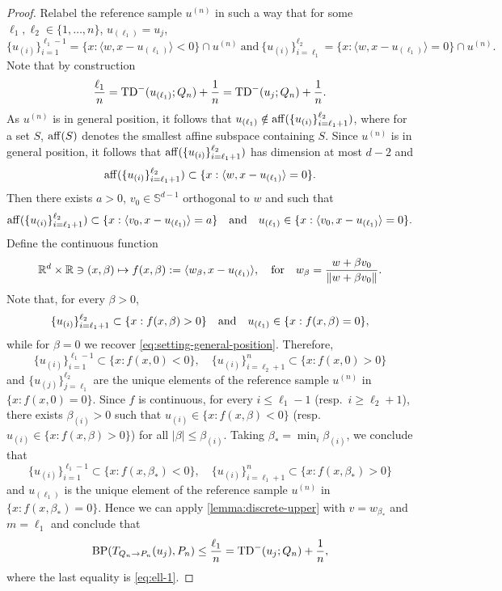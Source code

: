 \documentclass[11pt]{article}
\newcommand{\RR}{\mathbb{R}}
\newcommand{\R}{\RR}
\theoremstyle{plain}
\theoremstyle{definition}\newtheorem{definition}[theorem]{Definition}
\theoremstyle{remark}
\begin{document}
\begin{proof}
 Relabel the reference sample $u^{(n)}$ in such a way that for some ${\ell}_1,\ell_2\in \{1, \dots, n\}$,  $u_{(\ell_1)}= u_j$,
\begin{equation}
    \label{eq:setting-general-position}
     \{u_{(i)}\}_{i=1}^{\ell_1-1}= \{ x: \langle w, x-u_{(\ell_1)}\rangle < 0\} \cap u^{(n)} \ \text{and}\   \{u_{(i)}\}_{i=\ell_1}^{\ell_2}= \{ x: \langle w, x-u_{(\ell_1)}\rangle =  0\} \cap u^{(n)}.
\end{equation}
%
Note that by construction
%
\begin{equation}
    \label{eq:ell-1}
   \frac{ \ell_1}{n}=  {\rm TD}^{-}(u_{(\ell_1)};Q_n)+\frac{1}{n}=  {\rm TD}^{-}(u_j;Q_n)+\frac{1}{n}.
\end{equation}
%
 As $u^{(n)}$ is in general position, it follows that $ u_{(\ell_1)}\notin {\rm aff}( \{u_{(i)}\}_{i=\ell_1+1}^{\ell_2})$, where for a set $S$,   ${\rm aff}(S)$  denotes the smallest affine subspace containing $S$. Since  $u^{(n)}$ is in general position,  it follows that ${\rm aff}( \{u_{(i)}\}_{i=\ell_1+1}^{\ell_2})$ has  dimension  at most $d-2$ and  
 $$ {\rm aff}( \{u_{(i)}\}_{i=\ell_1+1}^{\ell_2})\subset  \{ x: \langle w, x-u_{(\ell_1)}\rangle =  0\}. $$ 
 Then there exists $a>0$,  $v_0 \in \mathbb{S}^{d-1} $ orthogonal to $ w$ and such that 
$$ {\rm aff}(\{u_{(i)}\}_{i=\ell_1+1}^{\ell_2})\subset \{  x: \langle  v_0,x-u_{(\ell_1)}  \rangle =a \} \quad {\rm and}\quad u_{(\ell_1)} \in \{  x: \langle v_0, x -u_{(\ell_1)} \rangle =0 \} . $$
%
Define the continuous function 
%
$$ \R^d\times \R \ni (x,\beta)\mapsto f(x,\beta):= \langle    w_\beta, x -u_{(\ell_1)} \rangle, \quad {\rm for }\quad  w_\beta =\frac{w+ \beta v_0}{\|w+ \beta v_0\|}.   $$
%
Note that, for every $\beta>0$, 
%
$$ \{u_{(i)}\}_{i=\ell_1+1}^{\ell_2} \subset  \{  x: f(x,\beta) >0  \} \quad {\rm and}\quad  u_{(\ell_1)} \in \{  x: f(x,\beta) =0  \}, $$
%
while for $\beta=0$ we recover \eqref{eq:setting-general-position}. Therefore,
%
$$ \{u_{(i)}\}_{i=1}^{\ell_1-1} \subset  \{  x: f(x,0) <0  \},  \quad \{u_{(i)}\}_{i=\ell_2+1}^{n} \subset  \{  x: f(x,0)>0  \} $$ 
%
and $ \{u_{(j)}\}_{j=\ell_1}^{\ell_2}$ are the unique elements of the reference sample $u^{(n)}$ in $\{  x: f(x,0) =0  \}$. Since $f$ is continuous, for every $i\leq \ell_1-1$ (resp.~$i\geq \ell_2+1$), there exists $\beta_{(i)}>0$ such that   $u_{(i)} \in \{  x: f(x,\beta) <0  \} $ (resp.~$u_{(i)} \in \{  x: f(x,\beta) >0  \} $) for all $|\beta|\leq \beta_{(i)}$. Taking $\beta_*=\min_{i} \beta_{(i)}$, we conclude that 
%
$$ \{u_{(i)}\}_{i=1}^{\ell_1-1} \subset  \{  x: f(x,\beta_*) <0  \},  \quad  \{u_{(i)}\}_{i=\ell_1+1}^{n} \subset  \{  x: f(x,\beta_*) >0  \}  $$
%
 and $ u_{(\ell_1)}$ is the unique element of the reference sample $u^{(n)}$ in $\{  x: f(x,\beta_*) =0  \}$. Hence we can apply \cref{lemma:discrete-upper} with $v=w_{\beta_*}$ and $m= \ell_1$ and conclude that 
$$  {\rm BP}({ T}_{Q_n\to P_n}(u_j), P_n) \leq  
\frac{\ell_1}{n}={\rm TD}^{-}(u_j;Q_n)+\frac{1}{n}, $$
where the last equality is \eqref{eq:ell-1}. 

\end{proof}
\end{document}
